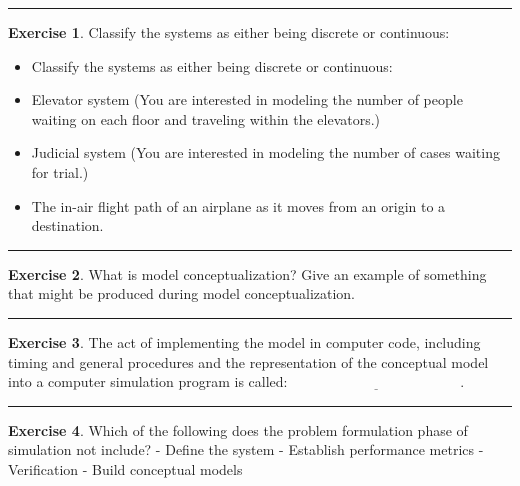 \documentclass[
]{book}
\theoremstyle{definition}
\theoremstyle{definition}
\theoremstyle{definition}
\newtheorem{exercise}{Exercise}[chapter]
\theoremstyle{definition}
\theoremstyle{remark}
\begin{document}
\begin{center}\rule{0.5\linewidth}{0.5pt}\end{center}

\begin{exercise}
\protect\hypertarget{exr:ch1P5}{}{\label{exr:ch1P5} }Classify the systems as either being discrete or continuous:

\begin{itemize}
\item
  Classify the systems as either being discrete or continuous:
\item
  Elevator system (You are interested in modeling the number of people
  waiting on each floor and traveling within the elevators.)
\item
  Judicial system (You are interested in modeling the number of cases
  waiting for trial.)
\item
  The in-air flight path of an airplane as it moves from an origin to a
  destination.
\end{itemize}
\end{exercise}

\begin{center}\rule{0.5\linewidth}{0.5pt}\end{center}

\begin{exercise}
\protect\hypertarget{exr:ch1P6}{}{\label{exr:ch1P6} }What is model conceptualization? Give an example of something that might
be produced during model conceptualization.
\end{exercise}

\begin{center}\rule{0.5\linewidth}{0.5pt}\end{center}

\begin{exercise}
\protect\hypertarget{exr:ch1P7}{}{\label{exr:ch1P7} }The act of implementing the model in computer code, including timing and
general procedures and the representation of the conceptual model into a
computer simulation program is called: \(\underline{\hspace{2in}}\).
\end{exercise}

\begin{center}\rule{0.5\linewidth}{0.5pt}\end{center}

\begin{exercise}
\protect\hypertarget{exr:ch1P8}{}{\label{exr:ch1P8} }Which of the following does the problem formulation phase of simulation
not include?
- Define the system
- Establish performance metrics
- Verification
- Build conceptual models
\end{exercise}
\end{document}
